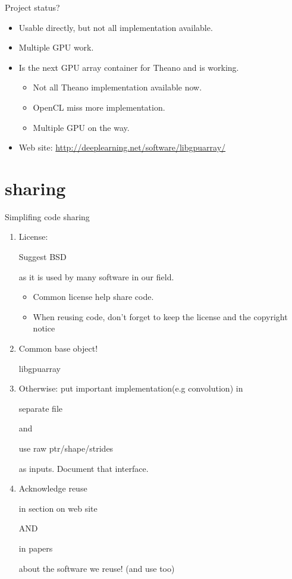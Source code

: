 \documentclass[utf8x,xcolor=pdftex,dvipsnames,table]{beamer}
\begin{document}
\begin{frame}{Project status?}
  \begin{itemize}
  \item Usable directly, but not all implementation available.
  \item Multiple GPU work.
  \item Is the next GPU array container for Theano and is working.
    \begin{itemize}
    \item Not all Theano implementation available now.
    \item OpenCL miss more implementation.
    \item Multiple GPU on the way.
    \end{itemize}
  \item Web site: \url{http://deeplearning.net/software/libgpuarray/}
  \end{itemize}
\end{frame}

\section{sharing}
\begin{frame}{Simplifing code sharing}
\begin{enumerate}
  \item<1-> License: \begin{bf}Suggest BSD\end{bf} as it is used by many software in our field.
    \begin{itemize}
    \item Common license help share code.
    \item When reusing code, don't forget to keep the license and the copyright notice
    \end{itemize}
  \item<2-> Common base object! \begin{bf}libgpuarray\end{bf}
  \item<3-> Otherwise: put important implementation(e.g convolution) in \begin{bf}separate file\end{bf} and \begin{bf}use raw ptr/shape/strides\end{bf} as inputs. Document that interface.
  \item<4-> Acknowledge reuse \begin{bf}in section on web site\end{bf} AND \begin{bf}in papers\end{bf} about the software we reuse! (and use too)
\end{enumerate}

\end{frame}
\end{document}
